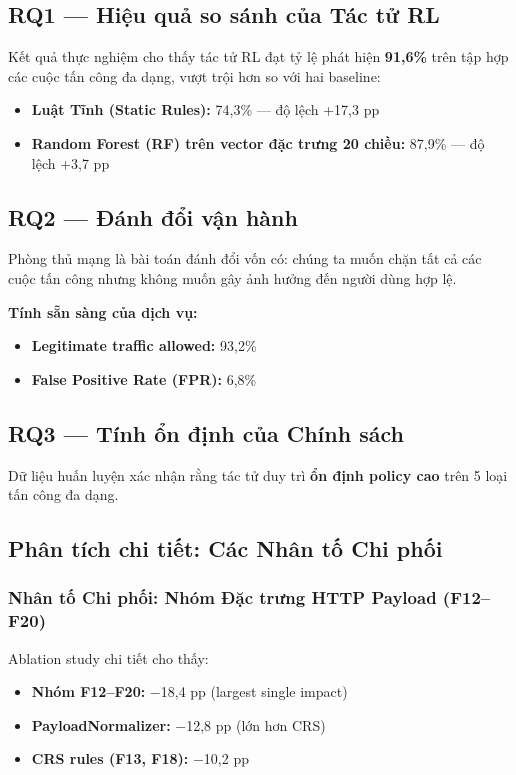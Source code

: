 \documentclass[12pt,a4paper,twoside]{report}
\begin{document}
\subsection{RQ1 --- Hiệu quả so sánh của Tác tử RL}

Kết quả thực nghiệm cho thấy tác tử RL đạt tỷ lệ phát hiện \textbf{91,6\%} trên tập hợp các cuộc tấn công đa dạng, vượt trội hơn so với hai baseline:
\begin{itemize}
\item \textbf{Luật Tĩnh (Static Rules):} 74,3\% --- độ lệch +17,3 pp
\item \textbf{Random Forest (RF) trên vector đặc trưng 20 chiều:} 87,9\% --- độ lệch +3,7 pp
\end{itemize}

\subsection{RQ2 --- Đánh đổi vận hành}

Phòng thủ mạng là bài toán đánh đổi vốn có: chúng ta muốn chặn tất cả các cuộc tấn công nhưng không muốn gây ảnh hưởng đến người dùng hợp lệ.

\textbf{Tính sẵn sàng của dịch vụ:}
\begin{itemize}
\item \textbf{Legitimate traffic allowed:} 93,2\%
\item \textbf{False Positive Rate (FPR):} 6,8\%
\end{itemize}

\subsection{RQ3 --- Tính ổn định của Chính sách}

Dữ liệu huấn luyện xác nhận rằng tác tử duy trì \textbf{ổn định policy cao} trên 5 loại tấn công đa dạng.

\subsection{Phân tích chi tiết: Các Nhân tố Chi phối}

\subsubsection{Nhân tố Chi phối: Nhóm Đặc trưng HTTP Payload (F12--F20)}

Ablation study chi tiết cho thấy:
\begin{itemize}
\item \textbf{Nhóm F12--F20:} $-$18,4 pp (largest single impact)
\item \textbf{PayloadNormalizer:} $-$12,8 pp (lớn hơn CRS)
\item \textbf{CRS rules (F13, F18):} $-$10,2 pp
\end{itemize}
\end{document}
